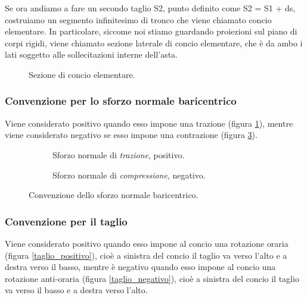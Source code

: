 \documentclass[main.tex]{subfiles}
\begin{document}
Se ora andiamo a fare un secondo taglio S2, punto definito come S2 = S1 + ds, costruiamo un segmento infinitesimo di tronco che viene chiamato concio elementare. In particolare, siccome noi stiamo guardando proiezioni sul piano di corpi rigidi, viene chiamato sezione laterale di concio elementare, che è da ambo i lati soggetto alle sollecitazioni interne dell’asta.

\begin{figure}[H]
  \centering
  \resizebox{0.5\textwidth}{!}{}
  \caption{Sezione di concio elementare.}
\end{figure}

\subsubsection{Convenzione per lo sforzo normale baricentrico}
Viene considerato positivo quando esso impone una trazione (figura \ref{normale_positivo}), mentre viene considerato negativo se esso impone una contrazione (figura \ref{normale_negativo}).

\begin{figure}[H]
  \begin{subfigure}[b]{.5\textwidth}
  	\centering
  	\resizebox{0.5\textwidth}{!}{}
  	\caption{Sforzo normale di \textit{trazione}, positivo.}
  	\label{normale_positivo}
  \end{subfigure}
  \hfill
  \begin{subfigure}[b]{.5\textwidth}
  \centering
  	\resizebox{0.5\textwidth}{!}{}
  	\caption{Sforzo normale di \textit{compressione}, negativo.}
  	\label{normale_negativo}
  \end{subfigure}
  \caption{Convenzione dello sforzo normale baricentrico.}
\end{figure}

\subsubsection{Convenzione per il taglio}
Viene considerato positivo quando esso impone al concio una rotazione oraria (figura \ref{taglio_positivo}), cioè a sinistra del concio il taglio va verso l’alto e a destra verso il basso, mentre è negativo quando esso impone al concio una rotazione anti-oraria (figura \ref{taglio_negativo}), cioè a sinistra del concio il taglio va verso il basso e a destra verso l’alto.
\end{document}

